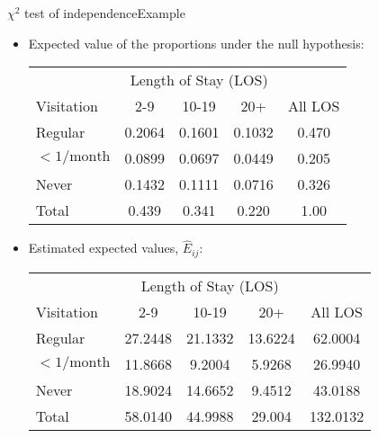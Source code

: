 \documentclass[xcolor=dvipsnames]{beamer}
\begin{document}
\begin{frame}{$\chi^2$ test of independence}{Example}
\begin{itemize}
	\item Expected value of the proportions under the null hypothesis:
	\vspace{1mm}
	{\scriptsize
		\begin{center}
		\begin{tabular}{|l|ccc|c|}
			\hline
			& \multicolumn{3}{c|}{Length of Stay (LOS)} & \\
			Visitation & 2-9 & 10-19 & 20+ & All LOS \\ \hline
			Regular           &0.2064 &0.1601 &0.1032 & 0.470\\
			$<1/\text{month}$ &0.0899 &0.0697 &0.0449 & 0.205\\
			Never             &0.1432 &0.1111 &0.0716 & 0.326\\ \hline
			Total & 0.439 & 0.341 & 0.220 &1.00 \\ \hline
		\end{tabular}
	\end{center}}  \pause
	\vspace{1mm}
	\item Estimated expected values, $\hat{E}_{ij}$:
	\vspace{1mm}
	{\scriptsize
		\begin{center}
			\begin{tabular}{|l|ccc|c|}
				\hline
				& \multicolumn{3}{c|}{Length of Stay (LOS)} & \\
				Visitation & 2-9 & 10-19 & 20+ & All LOS \\ \hline
				Regular           &27.2448 &21.1332& 13.6224& 62.0004  \\
				$<1/\text{month}$ &11.8668 & 9.2004& 5.9268& 26.9940 \\
				Never             &18.9024 &14.6652&  9.4512& 43.0188\\ \hline
				Total & 58.0140 & 44.9988 & 29.004 & 132.0132\\ \hline
			\end{tabular}
	\end{center}}
\end{itemize}
\end{frame}
\end{document}
